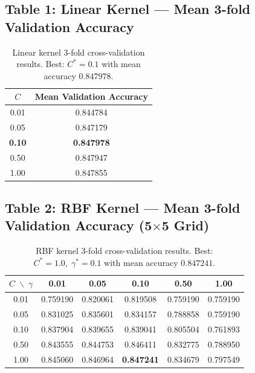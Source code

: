 \documentclass[12pt,a4paper]{article}
\begin{document}
\subsection{Table 1: Linear Kernel --- Mean 3-fold Validation Accuracy}

\begin{table}[h!]
\centering
\begin{tabular}{cc}
\toprule
$C$ & Mean Validation Accuracy \\
\midrule
0.01 & 0.844784 \\
0.05 & 0.847179 \\
\textbf{0.10} & \textbf{0.847978} \\
0.50 & 0.847947 \\
1.00 & 0.847855 \\
\bottomrule
\end{tabular}
\caption{Linear kernel 3-fold cross-validation results.
         Best: $C^* = 0.1$ with mean accuracy $0.847978$.}
\label{tab:linear}
\end{table}

\subsection{Table 2: RBF Kernel --- Mean 3-fold Validation Accuracy (5$\times$5 Grid)}

\begin{table}[h!]
\centering
\setlength{\tabcolsep}{6pt}
\begin{tabular}{c|ccccc}
\toprule
$C \;\backslash\; \gamma$ & 0.01 & 0.05 & 0.10 & 0.50 & 1.00 \\
\midrule
0.01 & 0.759190 & 0.820061 & 0.819508 & 0.759190 & 0.759190 \\
0.05 & 0.831025 & 0.835601 & 0.834157 & 0.788858 & 0.759190 \\
0.10 & 0.837904 & 0.839655 & 0.839041 & 0.805504 & 0.761893 \\
0.50 & 0.843555 & 0.844753 & 0.846411 & 0.832775 & 0.788950 \\
1.00 & 0.845060 & 0.846964 & \textbf{0.847241} & 0.834679 & 0.797549 \\
\bottomrule
\end{tabular}
\caption{RBF kernel 3-fold cross-validation results.
         Best: $C^* = 1.0,\; \gamma^* = 0.1$ with mean accuracy $0.847241$.}
\label{tab:rbf}
\end{table}
\end{document}
